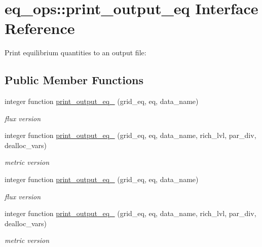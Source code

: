 \hypertarget{interfaceeq__ops_1_1print__output__eq}{}\section{eq\+\_\+ops\+:\+:print\+\_\+output\+\_\+eq Interface Reference}
\label{interfaceeq__ops_1_1print__output__eq}


Print equilibrium quantities to an output file\+:  


\subsection*{Public Member Functions}
\begin{DoxyCompactItemize}
\item 
integer function \hyperlink{interfaceeq__ops_1_1print__output__eq_a07fef57b633cc1b723405cb07d12ef24}{print\+\_\+output\+\_\+eq\+\_} (grid\+\_\+eq, eq, data\+\_\+name)
\begin{DoxyCompactList}\small\item\em flux version \end{DoxyCompactList}\item 
integer function \hyperlink{interfaceeq__ops_1_1print__output__eq_a7efa796c3c3e7cdbcb4fb51c9c6afcac}{print\+\_\+output\+\_\+eq\+\_} (grid\+\_\+eq, eq, data\+\_\+name, rich\+\_\+lvl, par\+\_\+div, dealloc\+\_\+vars)
\begin{DoxyCompactList}\small\item\em metric version \end{DoxyCompactList}\item 
integer function \hyperlink{interfaceeq__ops_1_1print__output__eq_a07fef57b633cc1b723405cb07d12ef24}{print\+\_\+output\+\_\+eq\+\_} (grid\+\_\+eq, eq, data\+\_\+name)
\begin{DoxyCompactList}\small\item\em flux version \end{DoxyCompactList}\item 
integer function \hyperlink{interfaceeq__ops_1_1print__output__eq_a7efa796c3c3e7cdbcb4fb51c9c6afcac}{print\+\_\+output\+\_\+eq\+\_} (grid\+\_\+eq, eq, data\+\_\+name, rich\+\_\+lvl, par\+\_\+div, dealloc\+\_\+vars)
\begin{DoxyCompactList}\small\item\em metric version \end{DoxyCompactList}\end{DoxyCompactItemize}


